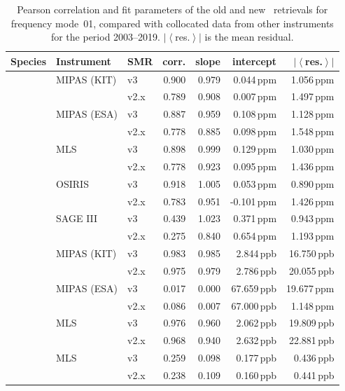 \begin{table}[tbhp]
\centering
\caption{Pearson correlation and fit parameters of the old and new \smr\
retrievals for frequency mode~01, compared with collocated data from other
instruments for the period 2003--2019.
$\left|\left<\right.\right.$res.$\left.\left.\right>\right|$ is the mean
residual.}
\label{tab:fm01:stats}
\begin{tabular}{lllrrrr}
    \toprule
    \textbf{Species} & \textbf{Instrument} & \textbf{SMR} & \textbf{corr.} & \textbf{slope} & \textbf{intercept} & \textbf{$\left|\left<\right.\right.$res.$\left.\left.\right>\right|$} \\
    \midrule
    \chem{O3}   & MIPAS (KIT)   & v3    & 0.900 & 0.979 & 0.044\,ppm    &  1.056\,ppm \\
                &               & v2.x  & 0.789 & 0.908 & 0.007\,ppm    &  1.497\,ppm \\
    \cline{2-7}
                & MIPAS (ESA)   & v3    & 0.887 & 0.959 & 0.108\,ppm    &  1.128\,ppm \\
                &               & v2.x  & 0.778 & 0.885 & 0.098\,ppm    &  1.548\,ppm \\
    \cline{2-7}
                & MLS           & v3    & 0.898 & 0.999 & 0.129\,ppm    &  1.030\,ppm \\
                &               & v2.x  & 0.778 & 0.923 & 0.095\,ppm    &  1.436\,ppm \\
    \cline{2-7}
                & OSIRIS        & v3    & 0.918 & 1.005 &  0.053\,ppm   &  0.890\,ppm \\
                &               & v2.x  & 0.783 & 0.951 & -0.101\,ppm   &  1.426\,ppm \\
    \cline{2-7}
                & SAGE III      & v3    & 0.439 & 1.023 & 0.371\,ppm    &  0.943\,ppm \\
                &               & v2.x  & 0.275 & 0.840 & 0.654\,ppm    &  1.193\,ppm \\
    \midrule
    \chem{N_2O} & MIPAS (KIT)   & v3    & 0.983 & 0.985 & 2.844\,ppb    & 16.750\,ppb \\
                &               & v2.x  & 0.975 & 0.979 & 2.786\,ppb    & 20.055\,ppb \\
    \cline{2-7}
                & MIPAS (ESA)   & v3    & 0.017 & 0.000 & 67.659\,ppb   & 19.677\,ppm \\
                &               & v2.x  & 0.086 & 0.007 & 67.000\,ppb   &  1.148\,ppm \\
    \cline{2-7}
                & MLS           & v3    & 0.976 & 0.960 & 2.062\,ppb    & 19.809\,ppb \\
                &               & v2.x  & 0.968 & 0.940 & 2.632\,ppb    & 22.881\,ppb \\
    \midrule
    \chem{ClO}  & MLS           & v3    & 0.259 & 0.098 & 0.177\,ppb    &  0.436\,ppb \\
                &               & v2.x  & 0.238 & 0.109 & 0.160\,ppb    &  0.441\,ppb \\
    \bottomrule
\end{tabular}
\end{table}

